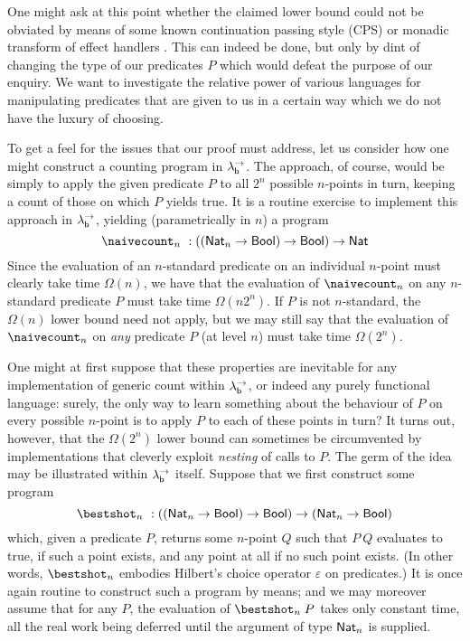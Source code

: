 \documentclass[12pt,phd,lfcs,twoside,openright,logo,leftchapter,normalheadings]{infthesis}
\theoremstyle{plain}
\theoremstyle{definition}
\begin{document}
One might ask at this point whether the claimed lower bound could not
be obviated by means of some known continuation passing style (CPS) or
monadic transform of effect handlers
\cite{HillerstromLAS17,Leijen17}. This can indeed be done, but only by
dint of changing the type of our predicates $P$ which would defeat the
purpose of our enquiry.  We want to investigate the relative power of
various languages for manipulating predicates that are given to us in
a certain way which we do not have the luxury of choosing.

To get a feel for the issues that our proof must address, let us
consider how one might construct a counting program in
$\lambda^\rightarrow_{\mathsf{b}}$.  The \naive approach, of course, would be simply to apply the
given predicate $P$ to all $2^n$ possible $n$-points in turn, keeping
a count of those on which $P$ yields true.  It is a routine exercise to
implement this approach in $\lambda^\rightarrow_{\mathsf{b}}$, yielding (parametrically in $n$)
a program
%
{
\[
  \naivecount_n ~: ((\Nat_n \to \Bool) \to \Bool) \to \Nat
\]}%
%
Since the evaluation of an $n$-standard predicate on an individual
$n$-point must clearly take time $\Omega(n)$, we have that the
evaluation of $\naivecount_n$ on any $n$-standard predicate $P$ must
take time $\Omega(n2^n)$. If $P$ is not $n$-standard, the $\Omega(n)$
lower bound need not apply, but we may still say that the evaluation
of $\naivecount_n$ on \emph{any} predicate $P$ (at level $n$) must
take time $\Omega(2^n)$.

One might at first suppose that these properties are inevitable for
any implementation of generic count within $\lambda^\rightarrow_{\mathsf{b}}$, or indeed any
purely functional language: surely, the only way to learn something
about the behaviour of $P$ on every possible $n$-point is to apply $P$
to each of these points in turn?  It turns out, however, that the
$\Omega(2^n)$ lower bound can sometimes be circumvented by
implementations that cleverly exploit \emph{nesting} of calls to $P$.
%
The germ of the idea may be illustrated within $\lambda^\rightarrow_{\mathsf{b}}$ itself.
Suppose that we first construct some program
%
{
\[
  \bestshot_n ~: ((\Nat_n \to \Bool) \to \Bool) \to (\Nat_n \to \Bool)
\]}%
%
which, given a predicate $P$, returns some $n$-point $Q$ such that
$P~Q$ evaluates to true, if such a point exists, and any point at all
if no such point exists.
%
(In other words, $\bestshot_n$ embodies Hilbert's choice operator
$\varepsilon$ on predicates.)
%
It is once again routine to construct such a program by \naive means;
and we may moreover assume that for any $P$, the evaluation of
$\bestshot_n\;P$ takes only constant time, all the real work being
deferred until the argument of type $\mathsf{Nat}_n$ is supplied.
\end{document}
